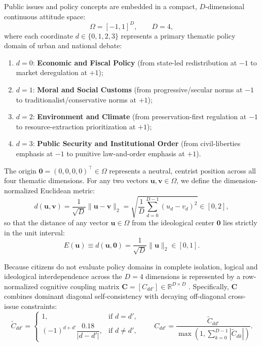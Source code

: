 Public issues and policy concepts are embedded in a compact, $D$-dimensional continuous attitude space:
\begin{equation}
    \Omega = [-1, 1]^D, \qquad D = 4,
    \label{eq:concept_space}
\end{equation}
where each coordinate $d \in \{0, 1, 2, 3\}$ represents a primary thematic policy domain of urban and national debate:
\begin{enumerate}
    \item $d = 0$: \textbf{Economic and Fiscal Policy} (from state-led redistribution at $-1$ to market deregulation at $+1$);
    \item $d = 1$: \textbf{Moral and Social Customs} (from progressive/secular norms at $-1$ to traditionalist/conservative norms at $+1$);
    \item $d = 2$: \textbf{Environment and Climate} (from preservation-first regulation at $-1$ to resource-extraction prioritization at $+1$);
    \item $d = 3$: \textbf{Public Security and Institutional Order} (from civil-liberties emphasis at $-1$ to punitive law-and-order emphasis at $+1$).
\end{enumerate}
The origin $\mathbf{0} = (0, 0, 0, 0)^\top \in \Omega$ represents a neutral, centrist position across all four thematic dimensions. For any two vectors $\mathbf{u}, \mathbf{v} \in \Omega$, we define the dimension-normalized Euclidean metric:
\begin{equation}
    d(\mathbf{u}, \mathbf{v}) = \frac{1}{\sqrt{D}} \|\mathbf{u} - \mathbf{v}\|_2 = \sqrt{\frac{1}{D} \sum_{d=0}^{D-1} (u_d - v_d)^2} \in [0, 2],
    \label{eq:normalized_metric}
\end{equation}
so that the distance of any vector $\mathbf{u} \in \Omega$ from the ideological center $\mathbf{0}$ lies strictly in the unit interval:
\begin{equation}
    E(\mathbf{u}) \equiv d(\mathbf{u}, \mathbf{0}) = \frac{1}{\sqrt{D}} \|\mathbf{u}\|_2 \in [0, 1].
    \label{eq:distance_to_center}
\end{equation}

Because citizens do not evaluate policy domains in complete isolation, logical and ideological interdependence across the $D = 4$ dimensions is represented by a row-normalized cognitive coupling matrix $\mathbf{C} = [C_{dd'}] \in \mathbb{R}^{D \times D}$ \citep{converse1964nature, friedkin2016network}. Specifically, $\mathbf{C}$ combines dominant diagonal self-consistency with decaying off-diagonal cross-issue constraints:
\begin{equation}
    \tilde{C}_{dd'} =
    \begin{cases}
        1, & \text{if } d = d', \\[4pt]
        (-1)^{d + d'} \dfrac{0.18}{|d - d'|}, & \text{if } d \neq d',
    \end{cases}
    \qquad
    C_{dd'} = \frac{\tilde{C}_{dd'}}{\max\!\left(1, \sum_{k=0}^{D-1} |\tilde{C}_{dk}|\right)}.
    \label{eq:coupling_matrix}
\end{equation}

